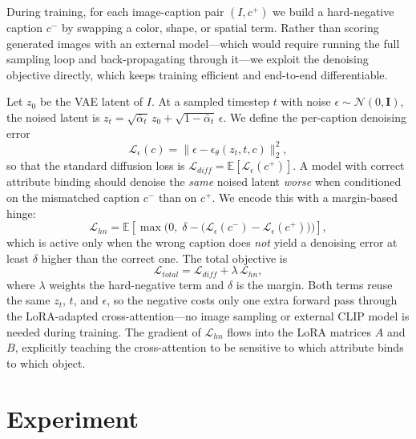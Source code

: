 \documentclass[12pt,onecolumn]{IEEEtran}
\begin{document}
During training, for each image-caption pair $(I, c^+)$ we build a hard-negative caption $c^-$ by swapping a color, shape, or spatial term. Rather than scoring generated images with an external model---which would require running the full sampling loop and back-propagating through it---we exploit the denoising objective directly, which keeps training efficient and end-to-end differentiable.

Let $z_0$ be the VAE latent of $I$. At a sampled timestep $t$ with noise $\epsilon \sim \mathcal{N}(0, \mathbf{I})$, the noised latent is $z_t = \sqrt{\bar{\alpha}_t}\, z_0 + \sqrt{1-\bar{\alpha}_t}\, \epsilon$. We define the per-caption denoising error
\begin{equation}
\mathcal{L}_{\epsilon}(c) = \lVert \epsilon - \epsilon_\theta(z_t, t, c) \rVert_2^2 ,
\end{equation}
so that the standard diffusion loss is $\mathcal{L}_{diff} = \mathbb{E}\!\left[\mathcal{L}_{\epsilon}(c^+)\right]$. A model with correct attribute binding should denoise the \emph{same} noised latent \emph{worse} when conditioned on the mismatched caption $c^-$ than on $c^+$. We encode this with a margin-based hinge:
\begin{equation}
\mathcal{L}_{hn} = \mathbb{E}\!\left[\max\!\big(0,\; \delta - \big(\mathcal{L}_{\epsilon}(c^-) - \mathcal{L}_{\epsilon}(c^+)\big)\big)\right],
\end{equation}
which is active only when the wrong caption does \emph{not} yield a denoising error at least $\delta$ higher than the correct one. The total objective is
\begin{equation}
\mathcal{L}_{total} = \mathcal{L}_{diff} + \lambda\, \mathcal{L}_{hn},
\end{equation}
where $\lambda$ weights the hard-negative term and $\delta$ is the margin. Both terms reuse the same $z_t$, $t$, and $\epsilon$, so the negative costs only one extra forward pass through the LoRA-adapted cross-attention---no image sampling or external CLIP model is needed during training. The gradient of $\mathcal{L}_{hn}$ flows into the LoRA matrices $A$ and $B$, explicitly teaching the cross-attention to be sensitive to which attribute binds to which object.

\par\vspace{0.5cm}


\vspace{0.3cm}

\section{Experiment}\label{sec:experiment}
\end{document}
